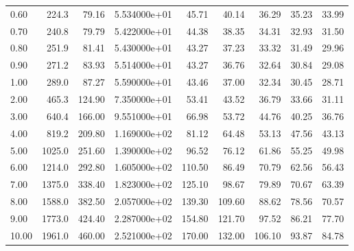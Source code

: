 \begin{tabular}{lrrrrrrrr}
0.60  &      224.3 &       79.16 &  5.534000e+01 &      45.71 &       40.14 &       36.29 &       35.23 &       33.99 \\
0.70  &      240.8 &       79.79 &  5.422000e+01 &      44.38 &       38.35 &       34.31 &       32.93 &       31.50 \\
0.80  &      251.9 &       81.41 &  5.430000e+01 &      43.27 &       37.23 &       33.32 &       31.49 &       29.96 \\
0.90  &      271.2 &       83.93 &  5.514000e+01 &      43.27 &       36.76 &       32.64 &       30.84 &       29.08 \\
1.00  &      289.0 &       87.27 &  5.590000e+01 &      43.46 &       37.00 &       32.34 &       30.45 &       28.71 \\
2.00  &      465.3 &      124.90 &  7.350000e+01 &      53.41 &       43.52 &       36.79 &       33.66 &       31.11 \\
3.00  &      640.4 &      166.00 &  9.551000e+01 &      66.98 &       53.72 &       44.76 &       40.25 &       36.76 \\
4.00  &      819.2 &      209.80 &  1.169000e+02 &      81.12 &       64.48 &       53.13 &       47.56 &       43.13 \\
5.00  &     1025.0 &      251.60 &  1.390000e+02 &      96.52 &       76.12 &       61.86 &       55.25 &       49.98 \\
6.00  &     1214.0 &      292.80 &  1.605000e+02 &     110.50 &       86.49 &       70.79 &       62.56 &       56.43 \\
7.00  &     1375.0 &      338.40 &  1.823000e+02 &     125.10 &       98.67 &       79.89 &       70.67 &       63.39 \\
8.00  &     1588.0 &      382.50 &  2.057000e+02 &     139.30 &      109.60 &       88.62 &       78.56 &       70.57 \\
9.00  &     1773.0 &      424.40 &  2.287000e+02 &     154.80 &      121.70 &       97.52 &       86.21 &       77.70 \\
10.00 &     1961.0 &      460.00 &  2.521000e+02 &     170.00 &      132.00 &      106.10 &       93.87 &       84.78 \\
\bottomrule
\end{tabular}
